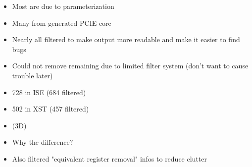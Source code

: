 \begin{itemize}
    \item Most are due to parameterization
    \item Many from generated PCIE core
    \item Nearly all filtered to make output more readable and make it easier to find bugs
    \item Could not remove remaining due to limited filter system (don't want to cause trouble later)
    \item 728 in ISE (684 filtered)
    \item 502 in XST (457 filtered)
    \item (3D)
    \item Why the difference?
    \item Also filtered "equivalent register removal" infos to reduce clutter
\end{itemize}
